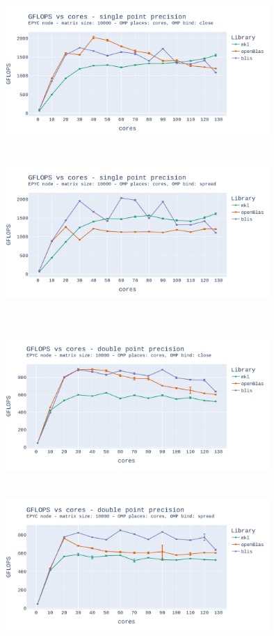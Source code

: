 \documentclass{report}
\begin{document}
\begin{figure}[h]
\hspace*{-2.5cm}
\includegraphics[width=10cm, height=6cm]{./images/fixed_size_epyc_float_gflops_close.pdf}
\includegraphics[width=10cm, height=6cm]{./images/fixed_size_epyc_float_gflops_spread.pdf}
\caption{\label{fig:fixed_size_epyc_float} }
\end{figure}

\begin{figure}[h]
\hspace*{-2.5cm}
\includegraphics[width=10cm, height=6cm]{./images/fixed_size_epyc_double_gflops_close.pdf}
\includegraphics[width=10cm, height=6cm]{./images/fixed_size_epyc_double_gflops_spread.pdf}
\caption{\label{fig:fixed_size_epyc_double} }
\end{figure}
\end{document}
